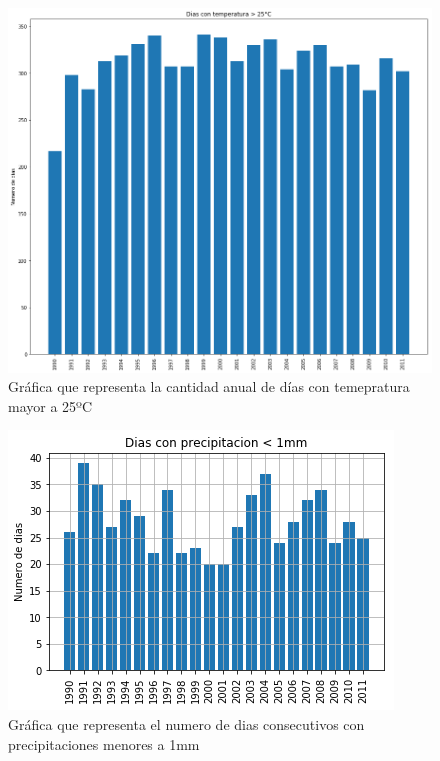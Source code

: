 \documentclass[12pt]{article}
\begin{document}
\begin{figure}
    \centering
    \includegraphics[scale=.3]{indice2.png}
    \caption{Gráfica que representa la cantidad anual de días con temepratura mayor a 25ºC}
    \label{fig:indice2}
\end{figure}
\begin{figure}
    \centering
    \includegraphics[scale=.8]{indice15.png}
    \caption{Gráfica que representa el numero de dias consecutivos con precipitaciones menores a 1mm}
    \label{fig:indice15}
\end{figure}
\end{document}

